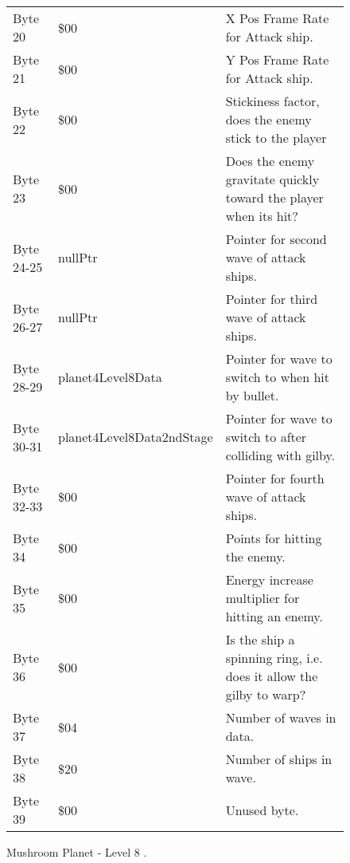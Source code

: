 \begin{figure}[H]
{\begin{adjustbox}{width=12cm}
\begin{tabular}{lll}
 Byte 20    & \$00                       & X Pos Frame Rate for Attack ship.                                   \\
 Byte 21    & \$00                       & Y Pos Frame Rate for Attack ship.                                   \\
 Byte 22    & \$00                       & Stickiness factor, does the enemy stick to the player               \\
 Byte 23    & \$00                       & Does the enemy gravitate quickly toward the player when its hit?    \\
 Byte 24-25 & nullPtr                   & Pointer for second wave of attack ships.                            \\
 Byte 26-27 & nullPtr                   & Pointer for third wave of attack ships.                             \\
 Byte 28-29 & planet4Level8Data         & Pointer for wave to switch to when hit by bullet.                   \\
 Byte 30-31 & planet4Level8Data2ndStage & Pointer for  wave to switch to after colliding with gilby.          \\
 Byte 32-33 & \$00                       & Pointer for fourth wave of attack ships.                            \\
 Byte 34    & \$00                       & Points for hitting the enemy.                                       \\
 Byte 35    & \$00                       & Energy increase multiplier for hitting an enemy.                    \\
 Byte 36    & \$00                       & Is the ship a spinning ring, i.e. does it allow the gilby to warp?  \\
 Byte 37    & \$04                       & Number of waves in data.                                            \\
 Byte 38    & \$20                       & Number of ships in wave.                                            \\
 Byte 39    & \$00                       & Unused byte.                                                        \\
\bottomrule
\end{tabular}

  \end{adjustbox}

  }\caption*{Mushroom Planet - Level 8
.}
\end{figure}

